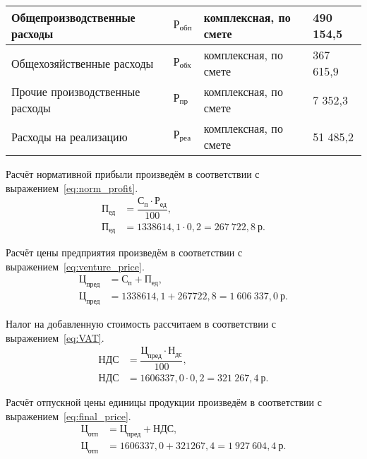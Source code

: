 \begin{table}[h!]
{\begin{tabular}{| p{} | p{} |
                      p{} | p{} |}
      Общепроизводственные \newline расходы & $ \text{Р}_{\text{обп}} $ &
      комплексная, по смете &
      490 154,5 \\ \hline

      Общехозяйственные расходы & $ \text{Р}_{\text{обх}} $ &
      комплексная, по смете &
      367 615,9 \\ \hline

      Прочие производственные \newline расходы & $ \text{Р}_{\text{пр}} $ &
      комплексная, по смете &
      7 352,3 \\ \hline

      Расходы на реализацию & $ \text{Р}_{\text{реа}} $ &
      комплексная, по смете &
      51 485,2 \\ \hline

    \end{tabular}
  }
\end{table}

\newpage

Расчёт нормативной прибыли произведём в соответствии с
выражением~\ref{eq:norm_profit}.
\begin{align}
  \label{eq:norm_profit}
  \text{П}_{\text{ед}} &= \dfrac{\text{С}_{\text{п}} \cdot
    \text{Р}_{\text{ед}}}{100}, \\
  \text{П}_{\text{ед}} &= 1338614{,}1 \cdot 0{,}2 =
    267~722{,}8 \: \text{р.} \nonumber
\end{align}

Расчёт цены предприятия произведём в соответствии с
выражением~\ref{eq:venture_price}.
\begin{align}
  \label{eq:venture_price}
  \text{Ц}_{\text{пред}} &= \text{С}_{\text{п}} + \text{П}_{\text{ед}}, \\
  \text{Ц}_{\text{пред}} &= 1338614{,}1 + 267722{,}8 =
    1~606~337{,}0 \: \text{р.} \nonumber
\end{align}

Налог на добавленную стоимость рассчитаем в соответствии с
выражением~\ref{eq:VAT}.
\begin{align}
  \label{eq:VAT}
  \text{НДС} &= \dfrac{\text{Ц}_{\text{пред}} \cdot \text{Н}_{\text{дс}}}{100}, \\
  \text{НДС} &= 1606337{,}0 \cdot 0{,}2 = 321~267{,}4 \: \text{р.} \nonumber
\end{align}

Расчёт отпускной цены единицы продукции произведём в соответствии с
выражением~\ref{eq:final_price}.
\begin{align}
  \label{eq:final_price}
  \text{Ц}_{\text{отп}} &= \text{Ц}_{\text{пред}} + \text{НДС}, \\
  \text{Ц}_{\text{отп}} &= 1606337{,}0 + 321267{,}4 =
    1~927~604{,}4 \: \text{р.} \nonumber
\end{align}
